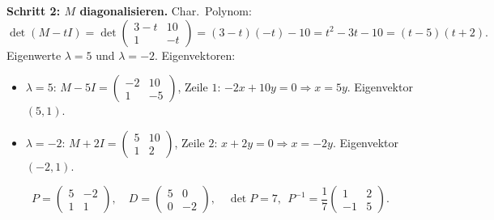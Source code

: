 \documentclass[a4paper,12pt]{article}
\newcommand{\EV}{Eigenvektor}
\begin{document}
\textbf{Schritt 2: $M$ diagonalisieren.} Char.\ Polynom:
\[
\det(M - tI) = \det\begin{pmatrix} 3-t & 10 \\ 1 & -t \end{pmatrix} = (3-t)(-t) - 10 = t^2 - 3t - 10 = (t-5)(t+2).
\]
Eigenwerte $\lambda = 5$ und $\lambda = -2$. Eigenvektoren:
\begin{itemize}[leftmargin=*, nosep]
    \item $\lambda = 5$: $M - 5I = \left(\begin{smallmatrix} -2 & 10 \\ 1 & -5 \end{smallmatrix}\right)$, Zeile $1$: $-2x + 10y = 0 \Rightarrow x = 5y$. \EV{} $(5, 1)$.
    \item $\lambda = -2$: $M + 2I = \left(\begin{smallmatrix} 5 & 10 \\ 1 & 2 \end{smallmatrix}\right)$, Zeile $2$: $x + 2y = 0 \Rightarrow x = -2y$. \EV{} $(-2, 1)$.
\end{itemize}
\[
P = \begin{pmatrix} 5 & -2 \\ 1 & 1 \end{pmatrix},\quad D = \begin{pmatrix} 5 & 0 \\ 0 & -2 \end{pmatrix},\quad
\det P = 7,\ \ P^{-1} = \frac{1}{7}\begin{pmatrix} 1 & 2 \\ -1 & 5 \end{pmatrix}.
\]
\end{document}
